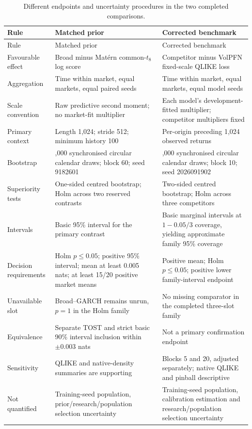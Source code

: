 \begin{longtable}{@{}>{\raggedright\arraybackslash}p{3.15cm}>{\raggedright\arraybackslash}p{5.3cm}>{\raggedright\arraybackslash}p{5.3cm}@{}}
\caption[Final inference rules]{Different endpoints and uncertainty procedures in the two completed comparisons.}\\
\toprule Rule & Matched prior & Corrected benchmark \\
\midrule
\endfirsthead
\toprule Rule & Matched prior & Corrected benchmark \\
\midrule
\endhead
Favourable effect & Broad minus Mat\'ern common-$t_8$ log score & Competitor minus VolPFN fixed-scale QLIKE loss \\
Aggregation & Time within market, equal markets, equal paired seeds & Time within market, equal markets, equal model seeds \\
Scale convention & Raw predictive second moment; no market-fit multiplier & Each model's development-fitted multiplier; competitor multipliers fixed \\
Primary context & Length 1,024; stride 512; minimum history 100 & Per-origin preceding 1,024 observed returns \\
Bootstrap & 5,000 synchronised circular calendar draws; block 60; seed 9182601 & 20,000 synchronised circular calendar draws; block 10; seed 2026091902 \\
Superiority tests & One-sided centred bootstrap; Holm across two reserved contrasts & Two-sided centred bootstrap; Holm across three competitors \\
Intervals & Basic 95\% interval for the primary contrast & Basic marginal intervals at $1-0.05/3$ coverage, yielding approximate family 95\% coverage \\
Decision requirements & Holm $p\leq0.05$; positive 95\% interval; mean at least 0.005 nats; at least 15/20 positive market means & Positive mean; Holm $p\leq0.05$; positive lower family-interval endpoint \\
Unavailable slot & Broad--GARCH remains unrun, $p=1$ in the Holm family & No missing comparator in the completed three-slot family \\
Equivalence & Separate TOST and strict basic 90\% interval inclusion within $\pm0.003$ nats & Not a primary confirmation endpoint \\
Sensitivity & QLIKE and native-density summaries are supporting & Blocks 5 and 20, adjusted separately; native QLIKE and pinball descriptive \\
Not quantified & Training-seed population, prior/research/population selection uncertainty & Training-seed population, calibration estimation and research/population selection uncertainty \\
\bottomrule
\end{longtable}

